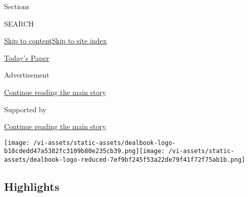 Sections

SEARCH

\protect\hyperlink{site-content}{Skip to
content}\protect\hyperlink{site-index}{Skip to site index}

\href{https://myaccount.nytimes.com/auth/login?response_type=cookie\&client_id=vi}{}

\href{https://www.nytimes.com/section/todayspaper}{Today's Paper}

Advertisement

\protect\hyperlink{after-top}{Continue reading the main story}

Supported by

\protect\hyperlink{after-sponsor}{Continue reading the main story}

\texttt{[image: /vi-assets/static-assets/dealbook-logo-b18cdedd47a5382fc3109b80e235cb39.png]}\texttt{[image: /vi-assets/static-assets/dealbook-logo-reduced-7ef9bf245f53a22de79f41f72f75ab1b.png]}

\hypertarget{highlights}{%
\subsection{Highlights}\label{highlights}}

